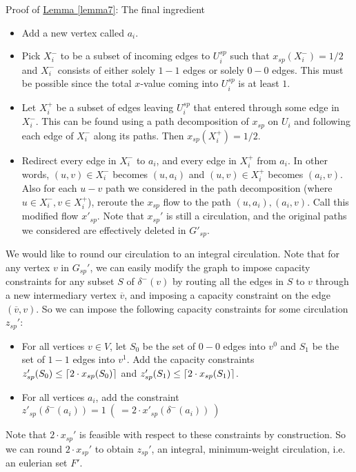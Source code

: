 \documentclass[./main.tex]{subfiles}
\begin{document}
\begin{subsection}{Proof of \hyperref[lemma7]{Lemma \ref{lemma7}}: The final ingredient}
\begin{definition}
		\begin{itemize}[-]
		\item Add a new vertex called $a_i$.
		\item Pick $X_i^-$ to be a subset of incoming edges to $U_i^{sp}$ such that $x_{sp}(X_i^-) = 1/2$ and $X_i^-$ consists of either solely $1-1$ edges or solely $0-0$ edges. This must be possible since the total $x$-value coming into $U_i^{sp}$ is at least $1$.
		\item Let $X_i^+$ be a subset of edges leaving $U_i^{sp}$ that entered through some edge in $X_i^-$. This can be found using a path decomposition of $x_{sp}$ on $U_i$ and following each edge of $X_i^-$ along its paths. Then $x_{sp}(X_i^+) = 1/2$.
		\item Redirect every edge in $X_i^-$ to $a_i$, and every edge in $X_i^+$ from $a_i$. In other words, $(u,v)\in X_i^-$ becomes $(u,a_i)$ and $(u,v)\in X_i^+$ becomes $(a_i, v)$. Also for each $u-v$ path we considered in the path decomposition (where $u\in X_i^-, v\in X_i^+$), reroute the $x_{sp}$ flow to the path $(u,a_i),(a_i,v)$. Call this modified flow $x'_{sp}$. Note that $x_{sp}'$ is still a circulation, and the original paths we considered are effectively deleted in $G'_{sp}$.
		\end{itemize}
	\end{definition}
	We would like to round our circulation to an integral circulation. 
	Note that for any vertex $v$ in $G_{sp}'$, we can easily modify the graph to impose capacity constraints for any subset $S$ of $\delta^-(v)$ by routing all the edges in $S$ to $v$ through a new intermediary vertex $\overline{v}$, and imposing a capacity constraint on the edge $(\overline{v},v)$. 
So we can impose the following capacity constraints for some circulation $z_{sp}'$:
	\begin{itemize}[-]
	\item For all vertices $v\in V$, let $S_0$ be the set of $0-0$ edges into $v^0$ and $S_1$ be the set of $1-1$ edges into $v^1$. 
			Add the capacity constraints $z'_{sp}(S_0)\leq \lceil2\cdot x_{sp}(S_0)\rceil$ and $z'_{sp}(S_1)\leq \lceil2\cdot x_{sp}(S_1)\rceil$.
	\item For all vertices $a_i$, add the constraint $z'_{sp}(\delta^-(a_i)) = 1\  (\ = 2\cdot x'_{sp}(\delta^-(a_i))\ )$
	\end{itemize}
	Note that $2\cdot x_{sp}'$ is feasible with respect to these constraints by construction. 
	So we can round $2\cdot x_{sp}'$ to obtain $z_{sp}'$, an integral, minimum-weight circulation, i.e. an eulerian set $F'$.\vspace{2mm}

\end{subsection}
\end{document}
